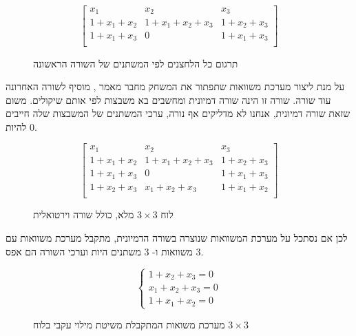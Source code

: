 \documentclass[12pt,leqno]{article}
\theoremstyle{theoremdd}
\begin{document}
\begin{figure}[ht]
    \caption{
        תרגום כל הלחצנים לפי המשתנים של השורה הראשונה
    }
    \label{fig: 3 x 3 board fill intire board}
    \centering
    \[
    \begin{bmatrix}
        x_1 & x_2 & x_3 \\
        1 + x_1 + x_2 & 1 + x_1 + x_2 + x_3 & 1 + x_2 + x_3 \\
        1 + x_1 + x_3 & 0 & 1 + x_1 + x_3 \\
    \end{bmatrix}
    \]
\end{figure}

על מנת ליצור מערכת משוואות
שתפתור את המשחק
מחבר מאמר
\cite{B1},
מוסיף לשורה האחרונה עוד שורה.
שורה זו הינה
שורה דמיונית ומחשבים בא משבצות
לפי אותם שיקולים.
משום שזאת שורה דמיונית, 
אנחנו לא מדליקים אף נורה, ערכי המשתנים של המשבצות
שלה חייבים להיות
$0$.

\begin{figure}[ht]
    \caption{לוח 
    $3 \times 3$
    מלא,
    כולל שורה וירטואלית
    }
    \label{fig: 3 x 3 board fill with virtual}
    \centering
    \[
        \begin{bmatrix}
            x_1 & x_2 & x_3 \\
            1 + x_1 + x_2 & 1 + x_1 + x_2 + x_3 & 1 + x_2 + x_3 \\
            1 + x_1 + x_3 & 0 & 1 + x_1 + x_3 \\
            \hline
            1 + x_2 + x_3 & x_1 + x_2 + x_3 & 1 + x_1 + x_2 \\
        \end{bmatrix}
    \]
\end{figure}

לכן אם נסתכל על
מערכת המשוואות 
שנוצרה בשורה הדמיונית,
מתקבל מערכת משוואות עם 
$3$
משוואות ו- 
$3$
משתנים
היות
וערכי השורה הם אפס.

\begin{figure}[ht]
    \caption{
        מערכת משואות המתקבלת משיטת מילוי עקבי
        בלוח 
        $3 \times 3$
    }
    \label{fig: eq system for spanish method 3 x 3}
    
    \[\begin{cases}
        1+x_{2}+x_{3}=0\\
        x_1 + x_2 + x_3 = 0\\
        1 + x_1 + x_2 = 0
        \end{cases} \]
\end{figure}
\end{document}

